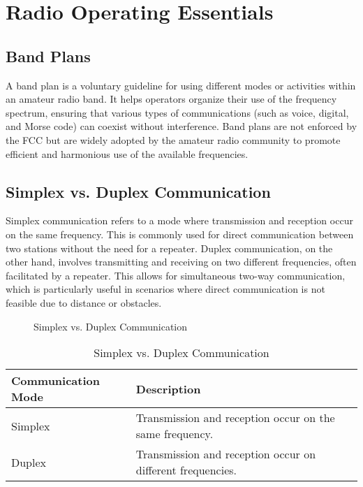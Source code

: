 \section{Radio Operating Essentials}
\label{section:operating_essentials}

\subsection*{Band Plans}
A band plan is a voluntary guideline for using different modes or activities within an amateur radio band. It helps operators organize their use of the frequency spectrum, ensuring that various types of communications (such as voice, digital, and Morse code) can coexist without interference. Band plans are not enforced by the FCC but are widely adopted by the amateur radio community to promote efficient and harmonious use of the available frequencies.

\subsection*{Simplex vs. Duplex Communication}
Simplex communication refers to a mode where transmission and reception occur on the same frequency. This is commonly used for direct communication between two stations without the need for a repeater. Duplex communication, on the other hand, involves transmitting and receiving on two different frequencies, often facilitated by a repeater. This allows for simultaneous two-way communication, which is particularly useful in scenarios where direct communication is not feasible due to distance or obstacles.

\begin{figure}[h]
    \centering
    \caption{Simplex vs. Duplex Communication}
    \label{fig:simplex_duplex}
\end{figure}

\begin{table}[h]
    \centering
    \caption{Simplex vs. Duplex Communication}
    \label{tab:simplex_duplex}
    \begin{tabular}{|l|l|}
        \hline
        \textbf{Communication Mode} & \textbf{Description} \\
        \hline
        Simplex & Transmission and reception occur on the same frequency. \\
        \hline
        Duplex & Transmission and reception occur on different frequencies. \\
        \hline
    \end{tabular}
\end{table}

